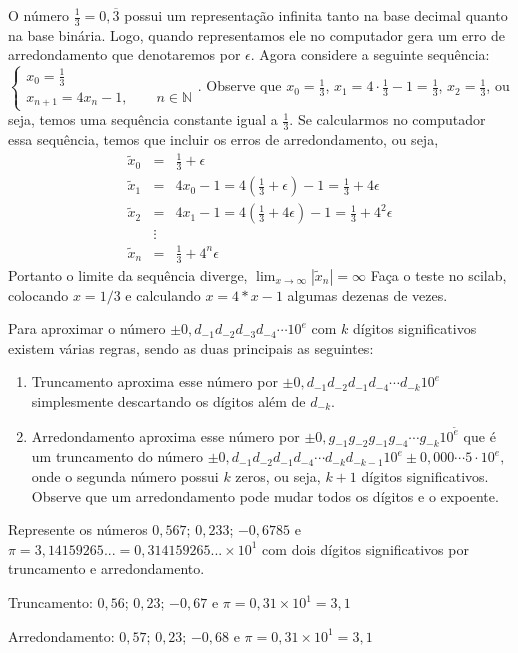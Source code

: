 \begin{ex}
O número $\frac{1}{3}=0,\overline{3}$ possui um representação infinita tanto na base decimal quanto na base binária. Logo, quando representamos ele no computador gera um erro de arredondamento que denotaremos por $\epsilon$. Agora considere a seguinte sequência:
$
\left\{\begin{array}{l}
x_0=\frac{1}{3}\\
x_{n+1}=4x_n-1,\qquad n\in\mathbb{N}
\end{array}\right..
$
Observe que $x_0=\frac{1}{3}$, $x_1=4\cdot \frac{1}{3}-1=\frac{1}{3}$, $x_2=\frac{1}{3}$, ou seja, temos uma sequência constante igual a $\frac{1}{3}$. Se calcularmos no computador essa sequência, temos que incluir os erros de arredondamento, ou seja,
\begin{eqnarray*}
\tilde{x}_0&=&\frac{1}{3}+\epsilon\\
\tilde{x}_1&=&4x_0-1=4\left(\frac{1}{3}+\epsilon\right)-1=\frac{1}{3}+4\epsilon\\
\tilde{x}_2&=&4x_1-1=4\left(\frac{1}{3}+4\epsilon\right)-1=\frac{1}{3}+4^2\epsilon\\
&\vdots&\\
\tilde{x}_n&=&\frac{1}{3}+4^n\epsilon
\end{eqnarray*}
Portanto o limite da sequência diverge,
$
\lim_{x\to\infty}|\tilde{x}_n|=\infty
$
Faça o teste no scilab, colocando $x=1/3$ e calculando $x=4*x-1$ algumas dezenas de vezes.
\end{ex}

Para aproximar o número $\pm 0,d_{-1}d_{-2}d_{-3}d_{-4}\cdots 10^e$ com $k$ dígitos significativos existem várias regras, sendo as duas principais as seguintes:
\begin{enumerate}
\item Truncamento aproxima esse número por
$
\pm 0,d_{-1}d_{-2}d_{-1}d_{-4}\cdots d_{-k} 10^e
$
simplesmente descartando os dígitos além de $d_{-k}$.
\item Arredondamento aproxima esse número por
$
\pm 0,g_{-1}g_{-2}g_{-1}g_{-4}\cdots g_{-k} 10^{\tilde{e}}
$
que é um truncamento do número
$
\pm 0,d_{-1}d_{-2}d_{-1}d_{-4}\cdots d_{-k}d_{-k-1} 10^e \pm 0,000\cdots 5\cdot 10^e,
$
onde o segunda número possui $k$ zeros, ou seja, $k+1$ dígitos significativos. Observe que um arredondamento pode mudar todos os dígitos e o expoente.
\end{enumerate}

\begin{ex} Represente os números $0,567$; $0,233$; $-0,6785$ e $\pi =3,14159265...=0,314159265...\times 10^1$ com dois dígitos significativos por truncamento e arredondamento.

Truncamento: $0,56$; $0,23$; $-0,67$ e $\pi =0,31\times 10^1=3,1$

Arredondamento: $0,57$; $0,23$; $-0,68$ e $\pi =0,31\times 10^1=3,1$
\end{ex}

